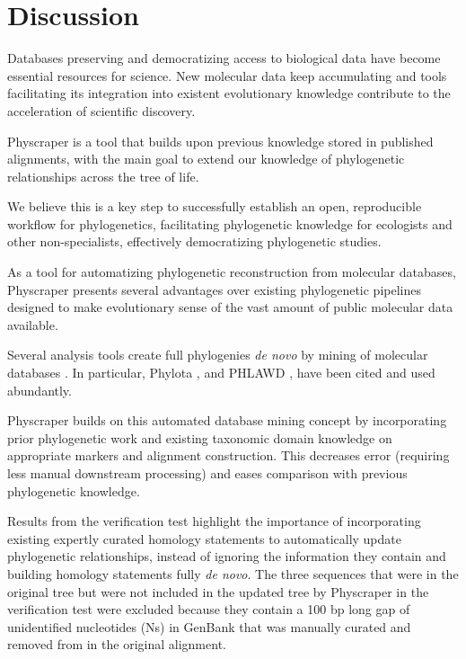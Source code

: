 \documentclass{bmcart}
\begin{document}
\section*{Discussion}
Databases preserving and democratizing access to biological data
have become essential resources for science.
New molecular data keep accumulating and tools facilitating its integration into
existent evolutionary knowledge contribute to the acceleration of scientific discovery.

Physcraper is a tool that builds upon previous knowledge stored in published
alignments, with the main goal to extend our knowledge of phylogenetic relationships
across the tree of life.

We believe this is a key step to successfully establish an open, reproducible workflow for phylogenetics,
facilitating phylogenetic knowledge for ecologists and other non-specialists, effectively
democratizing phylogenetic studies.

As a tool for automatizing phylogenetic reconstruction from molecular databases,
Physcraper presents several advantages over existing phylogenetic pipelines designed to
make evolutionary sense of the vast amount of
public molecular data available.

Several analysis tools create full phylogenies \textit{de novo} by mining of molecular
databases \cite{antonelli2017toward, sanderson2008phylota, smith2019pyphlawd,
bennett2018phylotar, pearse2013phylogenerator}.
In particular, Phylota \cite{sanderson2008phylota},
and PHLAWD \cite{smith2009mega}, have been cited and used abundantly.

Physcraper builds on this automated database mining concept by incorporating prior
phylogenetic work and existing taxonomic domain knowledge on appropriate markers
and alignment construction.
This decreases error (requiring less manual downstream processing) and
eases comparison with previous phylogenetic knowledge.

Results from the verification test highlight the importance of incorporating existing expertly
curated homology statements to automatically update phylogenetic relationships, instead
of ignoring the information they contain and building homology statements fully \textit{de novo}.
The three sequences that were in the original tree but were not included in
the updated tree by Physcraper in the verification test were excluded because
they contain a 100 bp long gap of unidentified nucleotides (Ns) in GenBank that
was manually curated and removed from in the original alignment.
\end{document}
